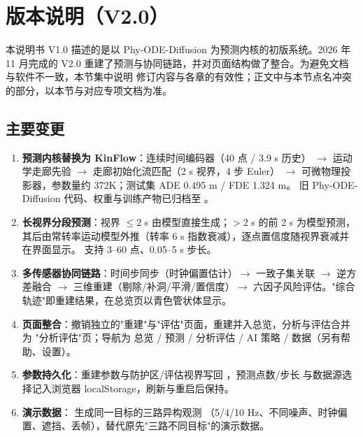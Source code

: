 \section*{版本说明（V2.0）}

本说明书 V1.0 描述的是以 Phy-ODE-Diffusion 为预测内核的初版系统。2026 年 11 月完成的
V2.0 重建了预测与协同链路，并对页面结构做了整合。为避免文档与软件不一致，本节集中说明
修订内容与各章的有效性；正文中与本节点名冲突的部分，以本节与对应专项文档为准。

\subsection*{主要变更}

\begin{enumerate}
  \item \textbf{预测内核替换为 KinFlow}：连续时间编码器（40 点 / 3.9 s 历史）
        $\rightarrow$ 运动学走廊先验 $\rightarrow$ 走廊初始化流匹配（2 s 视界，4 步 Euler）
        $\rightarrow$ 可微物理投影器，参数量约 372K；测试集 ADE 0.495 m / FDE 1.324 m。
        旧 Phy-ODE-Diffusion 代码、权重与训练产物已归档至 。
  \item \textbf{长视界分段预测}：视界 $\leq 2$ s 由模型直接生成；$>2$ s 的前 2 s 为模型预测，
        其后由常转率运动模型外推（转率 6 s 指数衰减），逐点置信度随视界衰减并在界面显示。
        支持 3--60 点、0.05--5 s 步长。
  \item \textbf{多传感器协同链路}：时间步同步（时钟偏置估计）$\rightarrow$ 一致子集关联
        $\rightarrow$ 逆方差融合 $\rightarrow$ 三维重建（剔除/补洞/平滑/置信度）$\rightarrow$
        六因子风险评估。"综合轨迹"即重建结果，在总览页以青色管状体显示。
  \item \textbf{页面整合}：撤销独立的"重建"与"评估"页面，重建并入总览，分析与评估合并为
        "分析评估"页；导航为 总览 / 预测 / 分析评估 / AI 策略 / 数据（另有帮助、设置）。
  \item \textbf{参数持久化}：重建参数与防护区/评估视界写回 ，预测点数/步长
        与数据源选择记入浏览器 localStorage，刷新与重启后保持。
  \item \textbf{演示数据}： 生成同一目标的三路异构观测
        （5/4/10 Hz、不同噪声、时钟偏置、遮挡、丢帧），替代原先"三路不同目标"的演示数据。
\end{enumerate}

